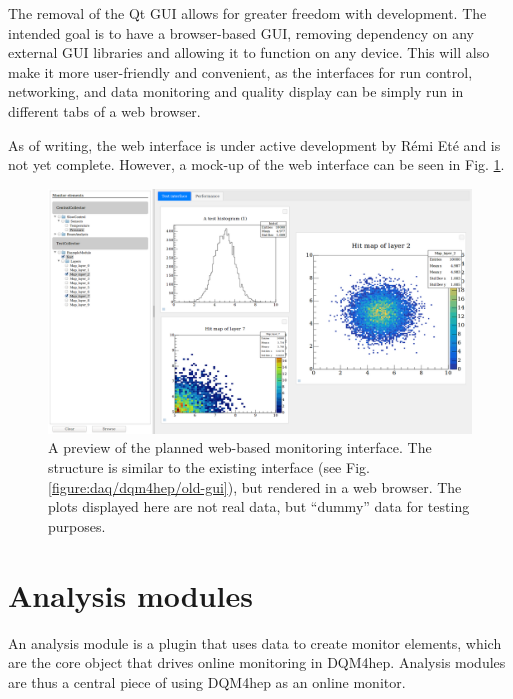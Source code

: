 The removal of the Qt \acrshort{GUI} allows for greater freedom with development. The intended goal is to have a browser-based GUI, removing dependency on any external \acrshort{GUI} libraries and allowing it to function on any device. This will also make it more user-friendly and convenient, as the interfaces for run control, networking, and data monitoring and quality display can be simply run in different tabs of a web browser.

As of writing, the web interface is under active development by R\'{e}mi Et\'{e} and is not yet complete. However, a mock-up of the web interface can be seen in Fig. \ref{figure:daq/dqm4hep/future-gui}.

\begin{figure}[h]
	\centering
	\includegraphics[width=1.0\textwidth]{../Pictures/ScreenshotWebMonitoring.png}
	\caption{A preview of the planned web-based monitoring interface. The structure is similar to the existing interface (see Fig. \ref{figure:daq/dqm4hep/old-gui}), but rendered in a web browser. The plots displayed here are not real data, but ``dummy'' data for testing purposes.}
	\label{figure:daq/dqm4hep/future-gui}
\end{figure}


\section{Analysis modules}
An analysis module is a plugin that uses data to create monitor elements, which are the core object that drives online monitoring in \acrshort{DQM4hep}. Analysis modules are thus a central piece of using \acrshort{DQM4hep} as an online monitor.

